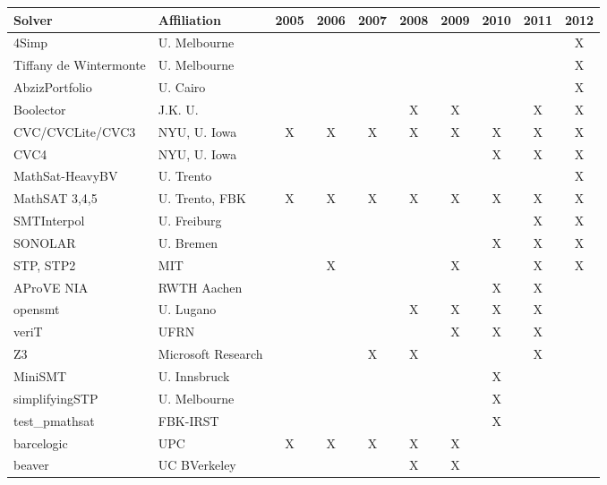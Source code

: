 \documentclass{llncs}
\begin{document}
\begin{table}[t]
\centering
\begin{tabular}{|l|l|c|c|c|c|c|c|c|c|}
\hline
Solver & Affiliation & 2005 & 2006 & 2007 & 2008 & 2009 & 2010 & 2011 & 2012 \\
\hline
4Simp	                 & U. Melbourne   &   &   &   &   &   &   &   & X \\								
Tiffany de Wintermonte & U. Melbourne 	&   &   &   &   &   &   &   & X \\							
AbzizPortfolio         & U. Cairo       &   &   &   &   &   &   &   & X \\							
Boolector              & J.K. U.        &   &   &   & X & X &   & X & X \\
CVC/CVCLite/CVC3       & NYU, U. Iowa   & X & X & X & X & X & X & X & X \\
CVC4	                 & NYU, U. Iowa   &   &   &   &   &   & X & X & X \\
MathSat-HeavyBV        & U. Trento      &   &   &   &   &   &   &   & X \\								
MathSAT 3,4,5          & U. Trento, FBK & X & X & X & X & X & X & X & X \\
SMTInterpol            & U. Freiburg    &   &   &   &   &   &   & X & X \\
SONOLAR                & U. Bremen      &   &   &   &   &   & X & X & X \\
STP, STP2              & MIT            &   & X &   &   & X &   & X & X \\
AProVE NIA             & RWTH Aachen    &   &   &   &   &   & X & X &   \\
opensmt                & U. Lugano      &   &   &   & X & X & X & X &   \\
veriT                  & UFRN           &   &   &   &   & X & X & X &   \\
Z3                & Microsoft Research  &   &   & X & X &   &   & X &   \\
MiniSMT                & U. Innsbruck   &   &   &   &   &   & X &   &   \\	
simplifyingSTP         & U. Melbourne   &   &   &   &   &   & X &   &   \\	
test\_pmathsat         & FBK-IRST       &   &   &   &   &   & X &   &   \\	
barcelogic             & UPC            & X & X & X & X & X &   &   &   \\	
beaver                 & UC BVerkeley   &   &   &   & X & X &   &   &   \\		

\end{tabular}
\end{table}
\end{document}
